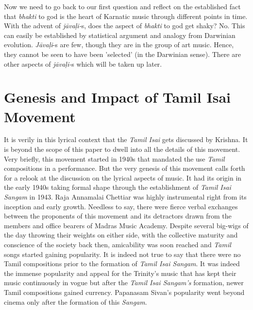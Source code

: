 {Now we need to go back to our first question and reflect on the established fact that \textit{bhakti} to god is the heart of Karnatic music through different points in time. With the advent of \textit{jāvaḷi-}s, does the aspect of \textit{bhakti} to god get shaky? No. This can easily be established by statistical argument and analogy from Darwinian evolution. \textit{Jāvaḷi}-s are few, though they are in the group of art music. Hence, they cannot be seen to have been 'selected' (in the Darwinian sense). There are other aspects of \textit{jāvaḷi-}s which will be taken up later.

\vspace{-.2cm}

\section*{Genesis and Impact of Tamil Isai Movement}

\vspace{-.1cm}

It is verily in this lyrical context that the \textit{Tamil Isai} gets discussed by Krishna. It is beyond the scope of this paper to dwell into all the details of this movement. Very briefly, this movement started in 1940s that mandated the use \textit{Tamil} compositions in a performance. But the very genesis of this movement calls forth for a relook at the discussion on the lyrical aspects of music. It had its origin in the early 1940s taking formal shape through the establishment of \textit{Tamil Isai Sangam} in 1943. Raja Annamalai Chettiar was highly instrumental right from its inception and early growth. Needless to say, there were fierce verbal exchanges between the proponents of this movement and its detractors drawn from the members and office bearers of Madras Music Academy. Despite several big-wigs of the day throwing their weights on either side, with the collective maturity and conscience of the society back then, amicability was soon reached and \textit{Tamil} songs started gaining popularity. It is indeed not true to say that there were no Tamil compositions prior to the formation of \textit{Tamil Isai Sangam}. It was indeed the immense popularity and appeal for the Trinity’s music that has kept their music continuously in vogue but after the \textit{Tamil Isai Sangam’s} formation, newer Tamil compositions gained currency. Papanasam Sivan’s popularity went beyond cinema only after the formation of this \textit{Sangam}.

}
